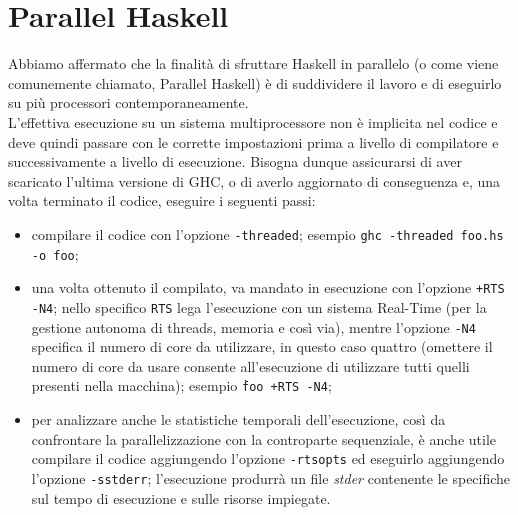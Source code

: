 \chapter{Parallel Haskell}
Abbiamo affermato che la finalità di sfruttare Haskell in parallelo (o come viene comunemente chiamato, Parallel Haskell) è di suddividere il lavoro e di eseguirlo su più processori contemporaneamente.\\
L'effettiva esecuzione su un sistema multiprocessore non è implicita nel codice e deve quindi passare con le corrette impostazioni prima a livello di compilatore e successivamente a livello di esecuzione. Bisogna dunque assicurarsi di aver scaricato l'ultima versione di GHC, o di averlo aggiornato di conseguenza e, una volta terminato il codice, eseguire i seguenti passi:
\begin{itemize}
\item{compilare il codice con l'opzione \texttt{-threaded}; esempio \texttt{ghc -threaded foo.hs -o foo};}
\item{una volta ottenuto il compilato, va mandato in esecuzione con l'opzione \texttt{+RTS -N4}; nello specifico \texttt{RTS} lega l'esecuzione con un sistema Real-Time (per la gestione autonoma di threads, memoria e così via), mentre l'opzione \texttt{-N4} specifica il numero di core da utilizzare, in questo caso quattro (omettere il numero di core da usare consente all'esecuzione di utilizzare tutti quelli presenti nella macchina); esempio \texttt{\.foo +RTS -N4};}
\item{per analizzare anche le statistiche temporali dell'esecuzione, così da confrontare la parallelizzazione con la controparte sequenziale, è anche utile compilare il codice aggiungendo l'opzione \texttt{-rtsopts} ed eseguirlo aggiungendo l'opzione \texttt{-sstderr}; l'esecuzione produrrà un file \textit{stder} contenente le specifiche sul tempo di esecuzione e sulle risorse impiegate.}
\end{itemize}

